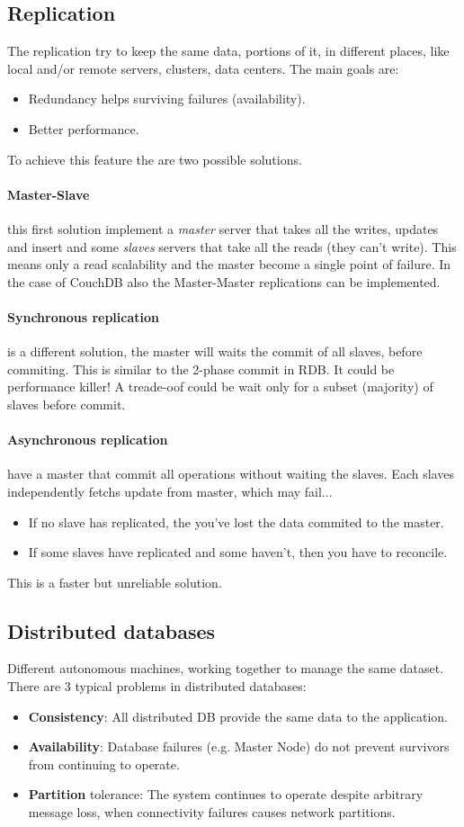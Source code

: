 \documentclass[12pt]{article}
\begin{document}
\subsection{Replication}
The replication try to keep the same data, portions of it, in different places, like local and/or remote servers, clusters, data centers. The main goals are:
\begin{itemize}
  \item Redundancy helps surviving failures (availability).
  \item Better performance.
\end{itemize}
To achieve this feature the are two possible solutions.
\paragraph{Master-Slave} this first solution implement a \textit{master} server that takes all the writes, updates and insert and some \textit{slaves} servers that take all the reads (they can't write). This means only a read scalability and the master become a single point of failure. In the case of CouchDB also the Master-Master replications can be implemented.
\paragraph{Synchronous replication} is a different solution, the master will waits the commit of all slaves, before commiting. This is similar to the 2-phase commit in RDB. It could be performance killer! A treade-oof could be wait only for a subset (majority) of slaves before commit.
\paragraph{Asynchronous replication} have a master that commit all operations without waiting the slaves. Each slaves independently fetchs update from master, which may fail...
\begin{itemize}
  \item If no slave has replicated, the you've lost the data commited to the master.
  \item If some slaves have replicated and some haven't, then you have to reconcile.
\end{itemize}
This is a faster but unreliable solution.

\subsection{Distributed databases}
Different autonomous machines, working together to manage the same dataset. There are 3 typical problems in distributed databases:
\begin{itemize}
  \item \textbf{Consistency}: All distributed DB provide the same data to the application.
  \item \textbf{Availability}: Database failures (e.g. Master Node) do not prevent survivors from continuing to operate.
  \item \textbf{Partition} tolerance: The system continues to operate despite arbitrary message loss, when connectivity failures causes network partitions.
\end{itemize}
\end{document}
